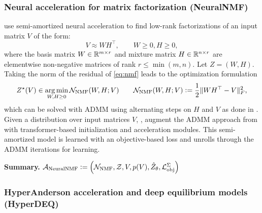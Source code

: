 \documentclass[twoside,11pt]{article}
\begin{document}
\subsubsection{Neural acceleration for matrix factorization (NeuralNMF)}
\citet{sjolund2022graphbased} use semi-amortized neural acceleration
to find low-rank factorizations of an input matrix $V$ of the form:
\begin{equation}
  V\approx WH^\top, \qquad W\geq 0, H\geq 0,
  \label{eq:nmf}
\end{equation}
where the basis matrix $W\in\mathbb{R}^{m\times r}$ and
mixture matrix $H\in\mathbb{R}^{n\times r}$ are elementwise
non-negative matrices of rank $r\leq\min(m,n)$.
Let $Z=(W,H)$. Taking the norm of the residual of \cref{eq:nmf}
leads to the optimization formulation
\begin{equation}
  Z^\star(V)\in \operatorname*{arg\,min}_{W,H\geq 0} {\mathcal{N}}_{\rm NMF}(W, H; V) \qquad
  {\mathcal{N}}_{\rm NMF}(W, H; V)\vcentcolon= \frac{1}{2}\|WH^\top - V\|_F^2,
  \label{eq:nmf-opt}
\end{equation}
which can be solved with ADMM \citep{boyd2011distributed}
using alternating steps on $H$ and $V$ as done in
\citet{huang2016flexible}.
Given a distribution over input matrices $V$,
\citet{sjolund2022graphbased}, augment the ADMM approach
from \citet{huang2016flexible} with transformer-based
initialization and acceleration modules.
This semi-amortized model is learned with an
objective-based loss and unrolls through
the ADMM iterations for learning.

\textbf{Summary.}
${\mathcal{A}}_{\rm NeuralNMF}\vcentcolon=\left({\mathcal{N}}_{\rm NMF}, {\mathcal{Z}}, V, p(V), \hat Z_\theta, {\mathcal{L}}_{\rm obj}^\Sigma\right)$

\subsubsection{HyperAnderson acceleration and
  deep equilibrium models (HyperDEQ)}
\label{sec:apps:deq}
\end{document}
